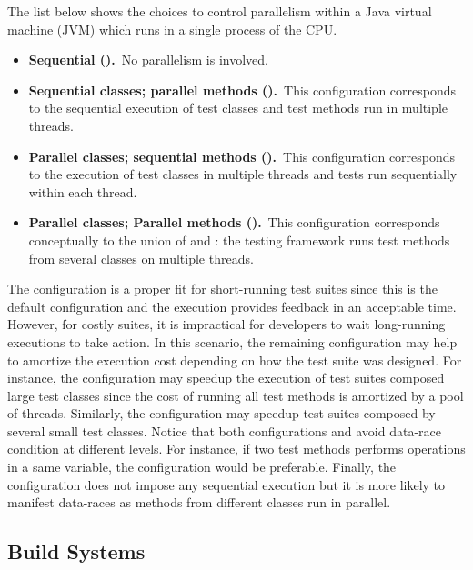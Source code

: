 The list below shows the choices to control parallelism within a Java
virtual machine (JVM) which runs in a single process of the CPU.

\begin{itemize}
\item
    \textbf{Sequential (\Seq).}~No parallelism is involved.
\item
    \textbf{Sequential classes; parallel methods
        (\SeqClassParMeth).}~This configuration corresponds to the
        sequential execution of test classes and test methods run in
        multiple threads.
\item
    \textbf{Parallel classes; sequential methods
        (\ParClassSeqMeth{}).}~This configuration corresponds to the
        execution of test classes in multiple threads and tests run
        sequentially within each thread.
\item
    \textbf{Parallel classes; Parallel methods
        (\ParClassParMeth).}~This configuration corresponds
        conceptually to the union of \ParClassSeqMeth{} and
        \SeqClassParMeth{}: the testing framework runs test methods
        from several classes on multiple threads.
\end{itemize}

The configuration \Seq{} is a proper fit for short-running test suites
since this is the default configuration and the execution provides
feedback in an acceptable time. However, for costly suites, it is
impractical for developers to wait long-running executions to take
action.  In this scenario, the remaining configuration may help to
amortize the execution cost depending on how the test suite was
designed. For instance, the configuration \SeqClassParMeth{} may
speedup the execution of test suites composed large test classes since
the cost of running all test methods is amortized by a pool of
threads. Similarly, the configuration \ParClassSeqMeth{} may speedup
test suites composed by several small test classes. Notice that both
configurations \ParClassSeqMeth{} and \SeqClassParMeth{} avoid
data-race condition at different levels. For instance, if two test methods performs operations in a same variable, the configuration \SeqClassParMeth{} would be preferable. Finally, 
the configuration \ParClassParMeth{} does not impose any sequential 
execution but it is more likely to manifest data-races as methods 
from different classes run in parallel.

\subsection{Build Systems}
\label{sec:builder}

